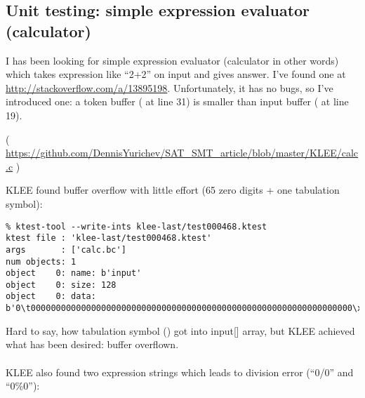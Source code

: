 \subsection{Unit testing: simple expression evaluator (calculator)}

I has been looking for simple expression evaluator (calculator in other words) which takes expression like ``2+2'' on input and gives answer.
I've found one at \url{http://stackoverflow.com/a/13895198}.
Unfortunately, it has no bugs, so I've introduced one: a token buffer ( at line 31) is smaller than input buffer ( at line 19).


( \url{https://github.com/DennisYurichev/SAT_SMT_article/blob/master/KLEE/calc.c} )

KLEE found buffer overflow with little effort (65 zero digits + one tabulation symbol):

\begin{lstlisting}
% ktest-tool --write-ints klee-last/test000468.ktest
ktest file : 'klee-last/test000468.ktest'
args       : ['calc.bc']
num objects: 1
object    0: name: b'input'
object    0: size: 128
object    0: data: b'0\t0000000000000000000000000000000000000000000000000000000000000000\xff\xff\xff\xff\xff\xff\xff\xff\xff\xff\xff\xff\xff\xff\xff\xff\xff\xff\xff\xff\xff\xff\xff\xff\xff\xff\xff\xff\xff\xff\xff\xff\xff\xff\xff\xff\xff\xff\xff\xff\xff\xff\xff\xff\xff\xff\xff\xff\xff\xff\xff\xff\xff\xff\xff\xff\xff\xff\xff\xff\xff\xff'
\end{lstlisting}

Hard to say, how tabulation symbol () got into input[] array, but KLEE achieved what has been desired: buffer overflown.\\
\\
KLEE also found two expression strings which leads to division error (``0/0'' and ``0\%0''):

